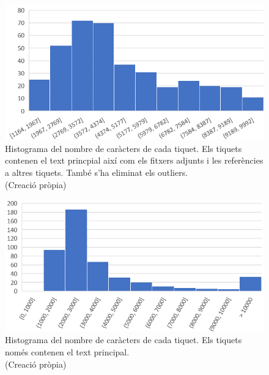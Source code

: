  
\begin{figure}[H]
    \centering
    \includegraphics[width=\textwidth]{histograma_num_chars_adj_refs_outliers.png}
    \caption[Histograma dels caràcters de cada tiquet amb adjunts i referències i sense outliers]{Histograma del nombre de caràcters de cada tiquet. Els tiquets contenen el text princpial així com els fitxers adjunts i les referències a altres tiquets. També s'ha eliminat els outliers. \\ (Creació pròpia)}
    \label{fig:histograma_num_chars_adj_refs_outliers}
\end{figure}


\begin{figure}[H]
    \centering
    \includegraphics[width=\textwidth]{histograma_num_chars_tiquets.png}
    \caption[Histograma dels caràcters del text principal de cada tiquet]{Histograma del nombre de caràcters de cada tiquet. Els tiquets només contenen el text principal. \\ (Creació pròpia)}
    \label{fig:histograma_num_chars_tiquets}
\end{figure}


